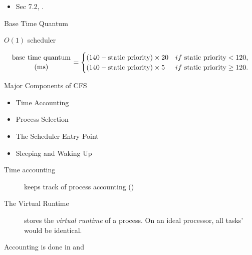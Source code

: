 \begin{itemize}
\item Sec 7.2, \cite{bovet2005understanding}.
\end{itemize}

\begin{frame}{Base Time Quantum}
  \begin{block}{$O(1)$ scheduler}
    \begin{scriptsize}
      \begin{equation*}
        \genfrac{}{}{0pt}{}{\text{base time quantum}}{(\text{ms})}=
        \begin{cases}
          (140 - \text{static priority})\times{}20& if\ \text{static priority} < 120,\\
          (140 - \text{static priority})\times{}5& if\ \text{static priority} \ge 120.
        \end{cases}
      \end{equation*}
    \end{scriptsize}
  \end{block}
\end{frame}

\begin{frame}{Major Components of CFS}
  \begin{itemize}
  \item Time Accounting
  \item Process Selection
  \item The Scheduler Entry Point
  \item Sleeping and Waking Up
  \end{itemize}
\end{frame}


\begin{frame}{Time accounting}
  \begin{description}
  \item[] keeps track of process accounting ()
  \end{description}
  \begin{center}
     
  \end{center}
\end{frame}

\begin{frame}
  \begin{block}{The Virtual Runtime}
    \begin{description}
    \item[] stores the \emph{virtual runtime} of a process. On an ideal
      processor, all tasks'  would be identical.
    \end{description}
    Accounting is done in  and 
  \end{block}
\end{frame}

